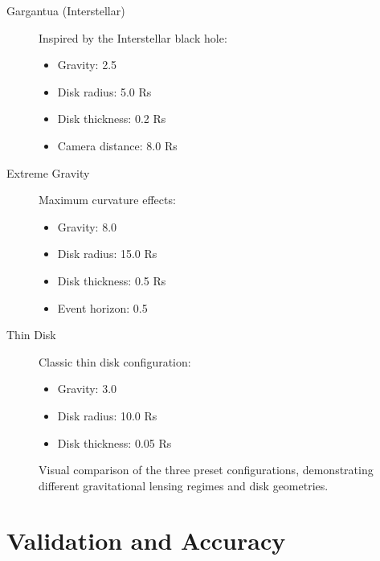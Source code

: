 \documentclass[12pt,a4paper]{article}
\theoremstyle{definition}
\theoremstyle{remark}
\begin{document}
\begin{description}
    \item[Gargantua (Interstellar)] Inspired by the Interstellar black hole:
        \begin{itemize}
            \item Gravity: 2.5
            \item Disk radius: 5.0 Rs
            \item Disk thickness: 0.2 Rs
            \item Camera distance: 8.0 Rs
        \end{itemize}
    
    \item[Extreme Gravity] Maximum curvature effects:
        \begin{itemize}
            \item Gravity: 8.0
            \item Disk radius: 15.0 Rs
            \item Disk thickness: 0.5 Rs
            \item Event horizon: 0.5
        \end{itemize}
    
    \item[Thin Disk] Classic thin disk configuration:
        \begin{itemize}
            \item Gravity: 3.0
            \item Disk radius: 10.0 Rs
            \item Disk thickness: 0.05 Rs
        \end{itemize}
\end{description}

\begin{figure}[H]
    \centering
    \caption{Visual comparison of the three preset configurations, demonstrating different gravitational lensing regimes and disk geometries.}
    \label{fig:preset_comparison}
\end{figure}

\section{Validation and Accuracy}
\end{document}
